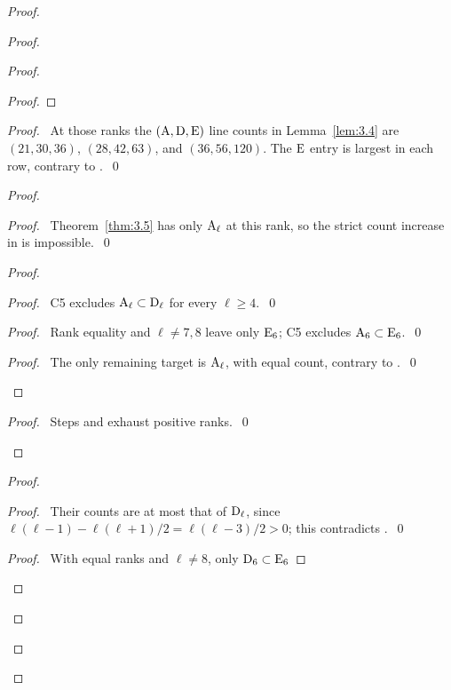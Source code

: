 \begin{proof}
\begin{proof}
\begin{proof}
\begin{proof}
   \end{proof}
   \begin{proof}\pf\ At those ranks the $(\mathrm{A},\mathrm{D},\mathrm{E})$ line counts in
    Lemma~\ref{lem:3.4} are $(21,30,36)$, $(28,42,63)$, and $(36,56,120)$.
    The $\mathrm{E}$ entry is largest in each row, contrary to .~\qed\end{proof}
   \begin{proof}
    \begin{proof}\pf\ Theorem~\ref{thm:3.5} has only $\mathrm{A}_\ell$ at this rank,
     so the strict count increase in  is impossible.~\qed\end{proof}
    \begin{proof}
     \begin{proof}\pf\ C5 excludes $\mathrm{A}_\ell\subset \mathrm{D}_\ell$ for every $\ell\geq4$.~\qed\end{proof}
     \begin{proof}\pf\ Rank equality and $\ell\ne7,8$ leave only $\mathrm{E}_6$;
      C5 excludes $\mathrm{A}_6\subset \mathrm{E}_6$.~\qed\end{proof}
     \qedstep
     \begin{proof}\pf\ The only remaining target is $\mathrm{A}_\ell$, with equal count,
      contrary to .~\qed\end{proof}
    \end{proof}
    \qedstep
    \begin{proof}\pf\ Steps  and  exhaust positive ranks.~\qed\end{proof}
   \end{proof}
   \begin{proof}
    \begin{proof}\pf\ Their counts are at most that of $\mathrm{D}_\ell$, since
     $\ell(\ell-1)-\ell(\ell+1)/2=\ell(\ell-3)/2>0$;
     this contradicts .~\qed\end{proof}
    \begin{proof}\pf\ With equal ranks and $\ell\ne8$, only $\mathrm{D}_6\subset \mathrm{E}_6$

\end{proof}
\end{proof}
\end{proof}
\end{proof}
\end{proof}
